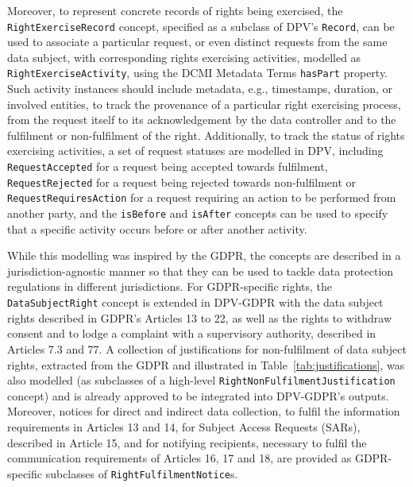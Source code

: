 Moreover, to represent concrete records of rights being exercised, the \texttt{RightExerciseRecord} concept, specified as a subclass of DPV's \texttt{Record}, can be used to associate a particular request, or even distinct requests from the same data subject, with corresponding rights exercising activities, modelled as \texttt{RightExerciseActivity}, using the DCMI Metadata Terms \texttt{hasPart} property.
Such activity instances should include metadata, e.g., timestamps, duration, or involved entities, to track the provenance of a particular right exercising process, from the request itself to its acknowledgement by the data controller and to the fulfilment or non-fulfilment of the right.
Additionally, to track the status of rights exercising activities, a set of request statuses are modelled in DPV, including \texttt{RequestAccepted} for a request being accepted towards fulfilment, \texttt{RequestRejected} for a request being rejected towards non-fulfilment or \texttt{RequestRequiresAction} for a request requiring an action to be performed from another party, and the \texttt{isBefore} and \texttt{isAfter} concepts can be used to specify that a specific activity occurs before or after another activity.

While this modelling was inspired by the GDPR, the concepts are described in a jurisdiction-agnostic manner so that they can be used to tackle data protection regulations in different jurisdictions.
For GDPR-specific rights, the \texttt{DataSubjectRight} concept is extended in DPV-GDPR with the data subject rights described in GDPR's Articles 13 to 22, as well as the rights to withdraw consent and to lodge a complaint with a supervisory authority, described in Articles 7.3 and 77.
A collection of justifications for non-fulfilment of data subject rights, extracted from the GDPR and illustrated in Table~\ref{tab:justifications}, was also modelled (as subclasses of a high-level \texttt{RightNonFulfilmentJustification} concept) and is already approved to be integrated into DPV-GDPR's outputs.
Moreover, notices for direct and indirect data collection, to fulfil the information requirements in Articles 13 and 14, for Subject Access Requests (SARs), described in Article 15, and for notifying recipients, necessary to fulfil the communication requirements of Articles 16, 17 and 18, are provided as GDPR-specific subclasses of \texttt{RightFulfilmentNotice}s.

